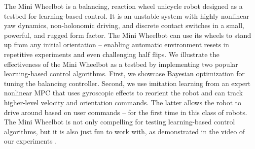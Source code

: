 The Mini Wheelbot is a balancing, reaction wheel unicycle robot designed as a testbed for learning-based control.
It is an unstable system with highly nonlinear yaw dynamics, non-holonomic driving, and discrete contact switches in a small, powerful, and rugged form factor.
The Mini Wheelbot can use its wheels to stand up from any initial orientation -- enabling automatic environment resets in repetitive experiments and even challenging half flips.
We illustrate the effectiveness of the Mini Wheelbot as a testbed by implementing two popular learning-based control algorithms.
First, we showcase Bayesian optimization for tuning the balancing controller.
Second, we use imitation learning from an expert nonlinear MPC that uses gyroscopic effects to reorient the robot and can track higher-level velocity and orientation commands.
The latter allows the robot to drive around based on user commands -- for the first time in this class of robots.
The Mini Wheelbot is not only compelling for testing learning-based control algorithms, but it is also just fun to work with, as demonstrated in the video of our experiments \videolink.
